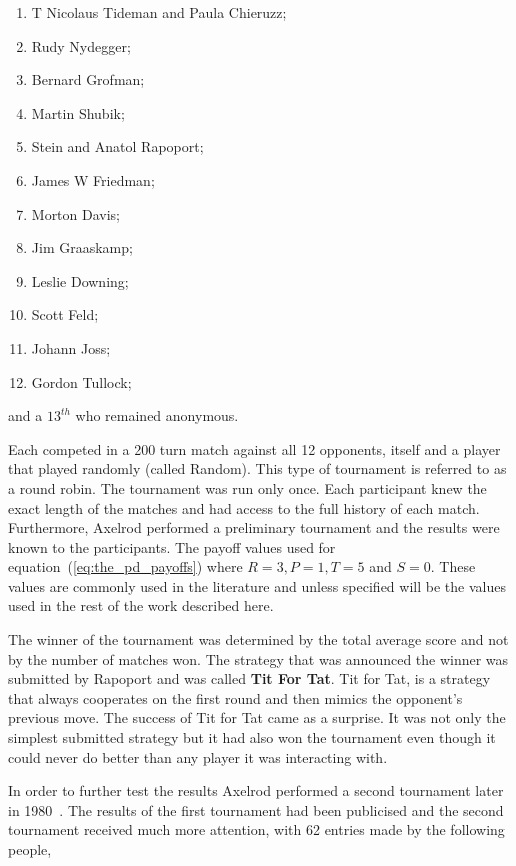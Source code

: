 \documentclass{article}
\theoremstyle{definition}
\begin{document}
\begin{multicols}{2}
    \begin{enumerate}
        \item T Nicolaus Tideman and Paula Chieruzz;
        \item Rudy Nydegger;
        \item Bernard Grofman;
        \item Martin Shubik;
        \item Stein and Anatol Rapoport;
        \item James W Friedman;
        \item Morton Davis;
        \item Jim Graaskamp;
        \item Leslie Downing;
        \item Scott Feld;
        \item Johann Joss;
        \item Gordon Tullock;
    \end{enumerate}
\end{multicols}

and a \(13^{th}\) who remained anonymous.

Each competed in a 200 turn match against all 12 opponents, itself and a player
that played randomly (called Random). This type of tournament is referred to as a round robin.
The tournament was run only once. Each participant knew
the exact length of the matches and had access to the full history of each match.
Furthermore, Axelrod performed a preliminary tournament and the results were known
to the participants. The payoff values used for equation~(\ref{eq:the_pd_payoffs}) where
\(R=3, P=1, T=5\) and \(S=0\). These values are commonly used in the literature
and unless specified will be the values used in the rest of the work described here.

The winner of the tournament was determined by the total average score and not by
the number of matches won. The strategy that was announced the winner was
submitted by Rapoport and was called \textbf{Tit For Tat}. Tit for Tat, is a
strategy that always cooperates on the first round and then mimics the opponent's
previous move.
The success of Tit for Tat came as a surprise. It was not only the simplest submitted
strategy but it had also won the tournament even though it could never do better
than any player it was interacting with.

In order to further test the results Axelrod performed a second
tournament later in 1980~\cite{Axelrod1980b}. The results of the first tournament
had been publicised and the second tournament received much more attention, with 62 entries
made by the following people,
\end{document}
